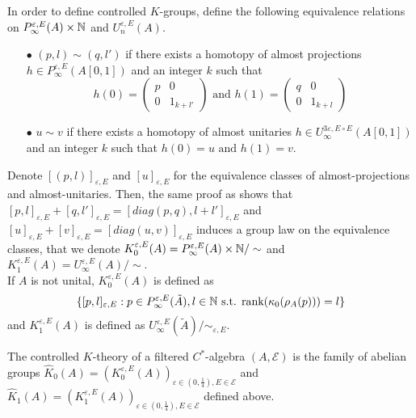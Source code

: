 In order to define controlled $K$-groups, define the following equivalence relations on $P^{\varepsilon, E}_\infty(A)\times \mathbb N$ and $U^{\varepsilon,E}_n(A)$.\\

\begin{itemize}

\item[$\bullet$] $(p,l) \sim (q,l')$ if there exists a homotopy of almost projections $h\in P^{\varepsilon, E}_\infty(A[0,1])$ and an integer $k$ such that 
\[h(0)=\begin{pmatrix} p & 0 \\ 0 & 1_{k+l'} \end{pmatrix} \text{ and }
h(1)=\begin{pmatrix} q & 0 \\ 0 & 1_{k+l} \end{pmatrix}\]
\item[$\bullet$] $u \sim v$ if there exists a homotopy of almost unitaries $h\in U^{3\varepsilon, E\circ E}_\infty(A[0,1])$ and an integer $k$ such that $h(0)= u \text{ and }h(1)=v$.\\
\end{itemize}

Denote $[(p,l)]_{\varepsilon,E}$ and $[u]_{\varepsilon,E}$ for the equivalence classes of almost-projections and almost-unitaries. Then, the same proof as \cite{OY2} shows that $[p,l]_{\varepsilon,E}+[q,l']_{\varepsilon,E}=[diag(p,q),l+l']_{\varepsilon,E}$ and $[u]_{\varepsilon,E}+[v]_{\varepsilon,E}=[diag(u,v)]_{\varepsilon,E}$ induces a group law on the equivalence classes, that we denote $K_0^{\varepsilon,E}(A) = P^{\varepsilon, E}_\infty(A)\times \mathbb N / \sim$ and $K_1^{\varepsilon,E}(A) = U^{\varepsilon, E}_\infty(A) / \sim$.\\

If $A$ is not unital, $K_0^{\varepsilon,E}(A)$ is defined as
\[\{[p,l]_{\varepsilon,E} : p\in P^{\varepsilon,E}_\infty (\tilde A), l\in \mathbb N \text{ s.t. rank}(\kappa_0(\rho_A(p)))=l \}\]
and $K_1^{\varepsilon,E}(A)$ is defined as $U_\infty^{\varepsilon,E}(\tilde A)/ \sim_{\varepsilon,E}$.\\

\begin{definition}
The controlled $K$-theory of a filtered $C^*$-algebra $(A,\mathcal E)$ is the family of abelian groups $\hat K_0(A) = (K_0^{\varepsilon,E}(A))_{\varepsilon\in (0,\frac{1}{4}),E\in\mathcal E}$ and $\hat K_1(A) = (K_1^{\varepsilon,E}(A))_{\varepsilon\in (0,\frac{1}{4}),E\in\mathcal E}$ defined above.\\
\end{definition}

